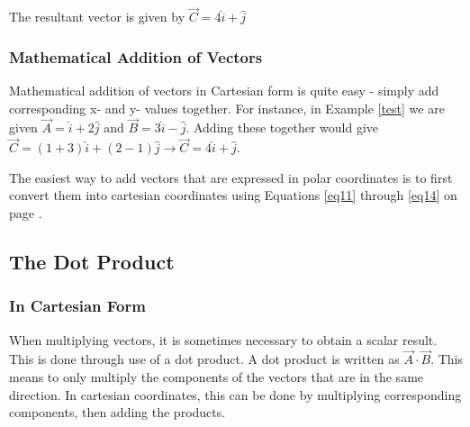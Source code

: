 \begin{mdframed}[backgroundcolor=blue!10!white]
\begin{center}
		
		
		
		
			
			
			
		\end{center}
		
		The resultant vector is given by $\boxed {\vec{C} = 4 \hat{i} + \hat{j}}$
		
	\end{mdframed}
	
	\subsubsection{Mathematical Addition of Vectors}
	Mathematical addition of vectors in Cartesian form is quite easy - simply add corresponding x- and y- values together.  For instance, in Example \ref{test} we are given  $\vec{A} =  \hat{i} + 2 \hat{j} $ and $\vec{B} = 3 \hat{i} - \hat{j} $.  Adding these together would give $\vec{C} = (1 +3) \hat{i} + (2-1)\hat{j} \longrightarrow \vec{C} =  4 \hat{i} + \hat{j} $.
	
	The easiest way to add vectors that are expressed in polar coordinates is to first convert them into cartesian coordinates using Equations \eqref{eq11} through \eqref{eq14} on page \pageref{eq11}.
	
	
	
	\subsection{The Dot Product}  
	\subsubsection{In Cartesian Form}
	When multiplying vectors, it is sometimes necessary to obtain a scalar result.  This is done through use of a dot product.  A dot product is written as $\vec{A} \cdot \vec{B} $.  This means to only multiply the components of the vectors that are in the same direction.  In cartesian coordinates, this can be done by multiplying corresponding components, then adding the products.  
	
